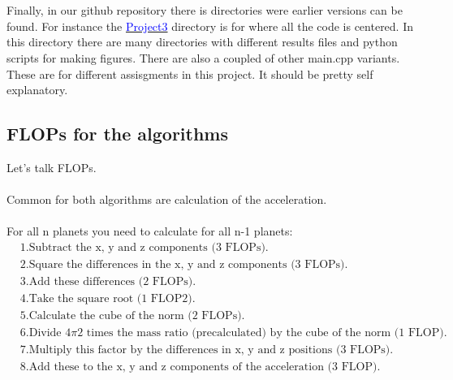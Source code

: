 \\
\\
Finally, in our github repository there is directories were earlier versions can be found. For instance the 
\href{https://github.com/erikfsk/Project-3/tree/master/Project3/}{\textcolor{blue}{Project3}} directory is for where all the code is centered. In this directory there are many directories with different results files and python scripts for making figures. There are also a coupled of other main.cpp variants. These are for different assisgments in this project. It should be pretty self explanatory. 


\subsection{FLOPs for the algorithms}\label{sec:flops}

Let's talk FLOPs. 
\\
\\
Common for both algorithms are calculation of the acceleration. 
\\
\\
For all n planets you need to calculate for all n-1 planets:
\begin{align*}
	&1. \text{Subtract the x, y and z components (3 FLOPs).}
	\\
	&2. \text{Square the differences in the x, y and z components (3 FLOPs).}
	\\
	&3. \text{Add these differences (2 FLOPs).}
	\\
	&4. \text{Take the square root (1 FLOP2).}
	\\
	&5.	\text{Calculate the cube of the norm (2 FLOPs).}
	\\
	&6. \text{Divide 4$\pi$2 times the mass ratio (precalculated) by the cube of the norm (1 FLOP).}
	\\
	&7. \text{Multiply this factor by the differences in x, y and z positions (3 FLOPs).}
	\\
	&8. \text{Add these to the x, y and z components of the acceleration (3 FLOP).}
\end{align*}





